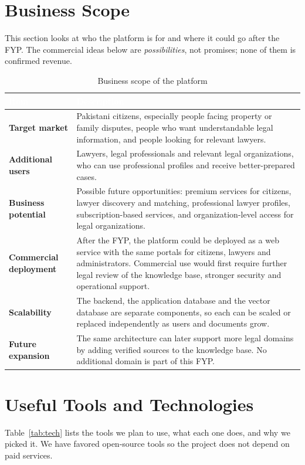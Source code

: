 \documentclass[12pt,a4paper]{report}
\newcommand{\thd}[1]{\textcolor{white}{\textbf{#1}}}
\newcommand{\headrow}{\rowcolor{tablehead}}
\begin{document}
\section{Business Scope}
This section looks at who the platform is for and where it could go after the FYP. The commercial ideas below are \emph{possibilities}, not promises; none of them is confirmed revenue.

\begin{table}[H]
\centering
\caption{Business scope of the platform}
\label{tab:business}
\begin{tabular}{|L{3.6cm}|L{10.4cm}|}
\hline
\headrow \thd{Item} & \thd{Description} \\ \hline
\textbf{Target market} & Pakistani citizens, especially people facing property or family disputes, people who want understandable legal information, and people looking for relevant lawyers. \\ \hline
{}\textbf{Additional users} & Lawyers, legal professionals and relevant legal organizations, who can use professional profiles and receive better-prepared cases. \\ \hline
\textbf{Business potential} & Possible future opportunities: premium services for citizens, lawyer discovery and matching, professional lawyer profiles, subscription-based services, and organization-level access for legal organizations. \\ \hline
{}\textbf{Commercial deployment} & After the FYP, the platform could be deployed as a web service with the same portals for citizens, lawyers and administrators. Commercial use would first require further legal review of the knowledge base, stronger security and operational support. \\ \hline
\textbf{Scalability} & The backend, the application database and the vector database are separate components, so each can be scaled or replaced independently as users and documents grow. \\ \hline
{}\textbf{Future expansion} & The same architecture can later support more legal domains by adding verified sources to the knowledge base. No additional domain is part of this FYP. \\ \hline
\end{tabular}
\end{table}

\section{Useful Tools and Technologies}
Table~\ref{tab:tech} lists the tools we plan to use, what each one does, and why we picked it. We have favored open-source tools so the project does not depend on paid services.
\end{document}
